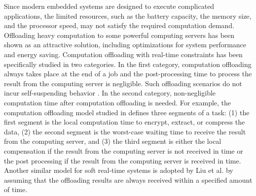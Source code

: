 Since modern embedded systems are designed to execute complicated applications, the limited resources, such as the battery capacity, the memory size, and the processor speed, may not satisfy the required computation demand. Offloading heavy computation to some powerful computing servers has been shown as an attractive solution, including optimizations for system performance and energy saving.
Computation offloading with real-time constraints has been specifically studied in two categories. In the first category, computation offloading always takes place at the end of a job and the post-processing time to process the result from the computing server is negligible. Such offloading scenarios do not incur self-suspending behavior  \cite{nimmagadda2010real,DBLP:conf/ecrts/TomaC13}. In the second category, non-negligible computation time after computation offloading is needed. For example, the computation offloading model studied in \cite{Liu_2014} defines three segments of a task: (1) the first segment is the local computation time to encrypt, extract, or compress the data, (2) the second segment is the worst-case waiting time to receive the result from the computing server, and (3) the third segment is either the local compensation if the result from the computing server is not received in time or the post processing if the result from the computing server is received in time. Another similar model for soft real-time systems is adopted by Liu et al. \cite{DBLP:conf/ecrts/LiuLZGH015} by assuming that the offloading results are always received within a specified amount of time.

  
  


